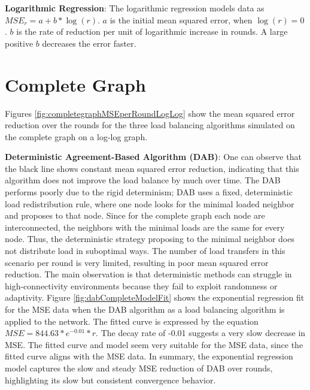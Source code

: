\textbf{Logarithmic Regression}: The logarithmic regression models data as $MSE_r=a+b*\log{(r)}$. $a$ is the initial mean squared error, when $\log{(r)}=0$. $b$ is the rate of reduction per unit of logarithmic increase in rounds. A large positive $b$ decreases the error faster.

\section{Complete Graph}\label{sec:completeGraph}
Figures \ref{fig:completegraphMSEperRoundLogLog} show the mean squared error reduction over the rounds for the three load balancing algorithms simulated on the complete graph on a log-log graph.


\textbf{Deterministic Agreement-Based Algorithm (DAB)}: One can observe that the black line shows constant mean squared error reduction, indicating that this algorithm does not improve the load balance by much over time. The DAB performs poorly due to the rigid determinism; DAB uses a fixed, deterministic load redistribution rule, where one node looks for the minimal loaded neighbor and proposes to that node. Since for the complete graph each node are interconnected, the neighbors with the minimal loads are the same for every node. Thus, the deterministic strategy proposing to the minimal neighbor does not distribute load in suboptimal ways. The number of load transfers in this scenario per round is very limited, resulting in poor mean squared error reduction. The main observation is that deterministic methods can struggle in high-connectivity environments because they fail to exploit randomness or adaptivity. Figure \ref{fig:dabCompleteModelFit} shows the exponential regression fit for the MSE data when the DAB algorithm as a load balancing algorithm is applied to the network. The fitted curve is expressed by the equation $MSE=844.63*e^{-0.01}*r$. The decay rate of -0.01 suggests a very slow decrease in MSE. The fitted curve and model seem very suitable for the MSE data, since the fitted curve aligns with the MSE data. In summary, the exponential regression model captures the slow and steady MSE reduction of DAB over rounds, highlighting its slow but consistent convergence behavior.

